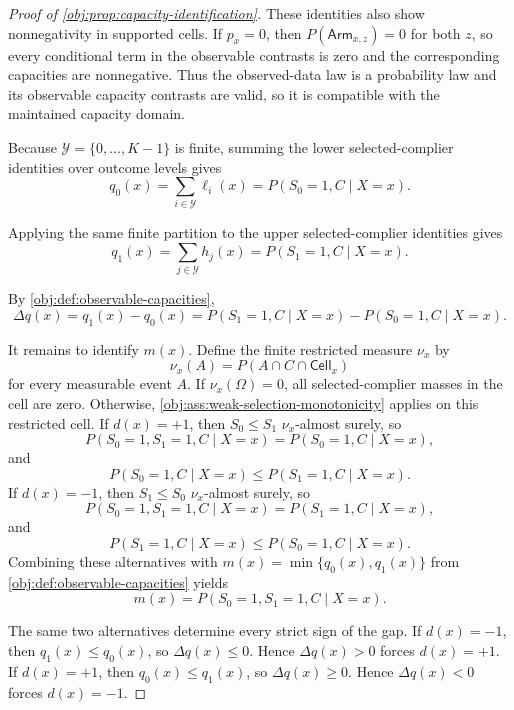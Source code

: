 \documentclass[11pt]{article}
\begin{document}
\begin{proof}[Proof of \cref{obj:prop:capacity-identification}]
These identities also show nonnegativity in supported cells.  If \(p_x=0\), then \(P(\mathsf{Arm}_{x,z})=0\) for both \(z\), so every conditional term in the observable contrasts is zero and the corresponding capacities are nonnegative.  Thus the observed-data law is a probability law and its observable capacity contrasts are valid, so it is compatible with the maintained capacity domain.

Because \(\mathcal Y=\{0,\ldots,K-1\}\) is finite, summing the lower selected-complier identities over outcome levels gives
\[
q_0(x)=\sum_{i\in\mathcal Y}\ell_i(x)
=
P(S_0=1,C\mid X=x).
\]

Applying the same finite partition to the upper selected-complier identities gives
\[
q_1(x)=\sum_{j\in\mathcal Y}h_j(x)
=
P(S_1=1,C\mid X=x).
\]

By \cref{obj:def:observable-capacities},
\[
\Delta q(x)=q_1(x)-q_0(x)
=
P(S_1=1,C\mid X=x)-P(S_0=1,C\mid X=x).
\]

It remains to identify \(m(x)\).  Define the finite restricted measure \(\nu_x\) by
\[
\nu_x(A)=P(A\cap C\cap\mathsf{Cell}_x)
\]
for every measurable event \(A\).  If \(\nu_x(\Omega)=0\), all selected-complier masses in the cell are zero.  Otherwise, \cref{obj:ass:weak-selection-monotonicity} applies on this restricted cell.  If \(d(x)=+1\), then \(S_0\le S_1\) \(\nu_x\)-almost surely, so
\[
P(S_0=1,S_1=1,C\mid X=x)=P(S_0=1,C\mid X=x),
\]
and
\[
P(S_0=1,C\mid X=x)\le P(S_1=1,C\mid X=x).
\]
If \(d(x)=-1\), then \(S_1\le S_0\) \(\nu_x\)-almost surely, so
\[
P(S_0=1,S_1=1,C\mid X=x)=P(S_1=1,C\mid X=x),
\]
and
\[
P(S_1=1,C\mid X=x)\le P(S_0=1,C\mid X=x).
\]
Combining these alternatives with \(m(x)=\min\{q_0(x),q_1(x)\}\) from \cref{obj:def:observable-capacities} yields
\[
m(x)=P(S_0=1,S_1=1,C\mid X=x).
\]

The same two alternatives determine every strict sign of the gap.  If \(d(x)=-1\), then \(q_1(x)\le q_0(x)\), so \(\Delta q(x)\le0\).  Hence \(\Delta q(x)>0\) forces \(d(x)=+1\).  If \(d(x)=+1\), then \(q_0(x)\le q_1(x)\), so \(\Delta q(x)\ge0\).  Hence \(\Delta q(x)<0\) forces \(d(x)=-1\).


\end{proof}
\end{document}
